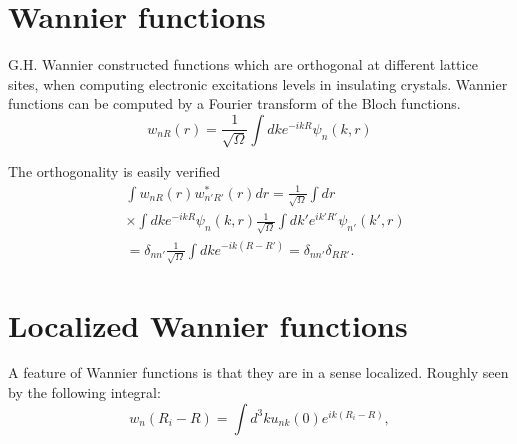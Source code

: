 \documentclass[12pt,a4paper,english]{beamer}
\newcommand{\braopket}[3]{\langle #1|#2|#3\rangle}
\begin{document}

\section{Wannier functions}
\begin{frame}
  G.H. Wannier constructed functions which are orthogonal at different lattice sites, when computing electronic excitations levels in insulating crystals. 
  Wannier functions can be computed by a Fourier transform of the Bloch functions.
  $$w_{nR}(r)=\frac{1}{\sqrt \Omega}\int dke^{-ikR}\psi_n(k,r)$$
\end{frame}
\begin{frame}
  The orthogonality is easily verified
  \begin{equation}
	\begin{split}
			&\int w_{nR}(r)w_{n'R'}^*(r)dr=\frac{1}{\sqrt\Omega}\int dr\\
			&\times\int dke^{-ikR}\psi_n(k,r)\frac{1}{\sqrt \Omega}\int dk'e^{ik'R'}\psi_{n'}(k',r)\\
	&=\delta_{nn'}\frac{1}{\sqrt \Omega}\int dke^{-ik(R-R')}=\delta_{nn'}\delta_{RR'}.
	\end{split}
	\label{eq:orthoRR'}
  \end{equation}
\end{frame}
\section{Localized Wannier functions}
\begin{frame}
  A feature of Wannier functions is that they are in a sense localized.
  Roughly seen by the following integral:
  \begin{equation}
	  w_{n}(R_i-R)=\int d^3ku_{nk}(0)e^{ik(R_i-R)},
	    \label{waneq:decay}
	  \end{equation}
\end{frame}
\end{document}
